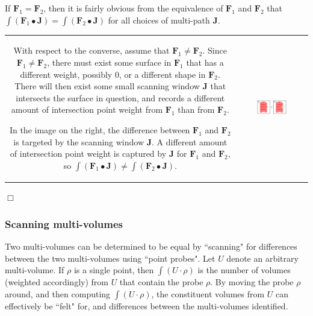 If \(\mathbf{F}_1 = \mathbf{F}_2\), then it is fairly obvious from the equivalence of \(\mathbf{F}_1\) and \(\mathbf{F}_2\) that \(\int (\mathbf{F}_1 \bullet \mathbf{J}) = \int (\mathbf{F}_2  \bullet \mathbf{J})\) for all choices of multi-path \(\mathbf{J}\). 

\vspace{5mm}

\begin{tabular}{cc}
\parbox{0.5\textwidth}{
With respect to the converse, assume that \(\mathbf{F}_1 \neq \mathbf{F}_2\). Since \(\mathbf{F}_1 \neq \mathbf{F}_2\), there must exist some surface in \(\mathbf{F}_1\) that has a different weight, possibly \(0\), or a different shape in \(\mathbf{F}_2\). There will then exist some small scanning window \(\mathbf{J}\) that intersects the surface in question, and records a different amount of intersection point weight from \(\mathbf{F}_1\) than from \(\mathbf{F}_2\).

In the image on the right, the difference between \(\mathbf{F}_1\) and \(\mathbf{F}_2\) is targeted by the scanning window \(\mathbf{J}\). A different amount of intersection point weight is captured by \(\mathbf{J}\) for \(\mathbf{F}_1\) and \(\mathbf{F}_2\), so \(\int (\mathbf{F}_1 \bullet \mathbf{J}) \neq \int (\mathbf{F}_2 \bullet \mathbf{J})\).
} & \parbox{0.5\textwidth}{
\includegraphics[width = 0.5\textwidth]{Point_totals/scanning_surfaces_using_paths}
}
\end{tabular}

\(\Box\)

\subsubsection{Scanning multi-volumes}

Two multi-volumes can be determined to be equal by ``scanning" for differences between the two multi-volumes using ``point probes". Let \(U\) denote an arbitrary multi-volume. If \(\rho\) is a single point, then \(\int (U \cdot \rho)\) is the number of volumes (weighted accordingly) from \(U\) that contain the probe \(\rho\). By moving the probe \(\rho\) around, and then computing \(\int (U \cdot \rho)\), the constituent volumes from \(U\) can effectively be ``felt" for, and differences between the multi-volumes identified.  

